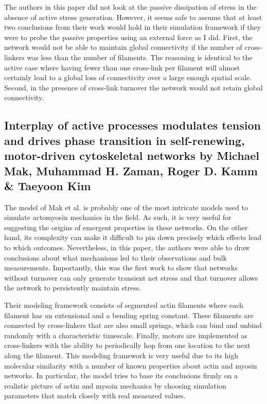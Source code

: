 The authors in this paper did not look at the passive dissipation of stress in the absence of active stress generation.  However, it seems safe to assume that at least two conclusions from their work would hold in their simulation framework if they were to probe the passive properties using an external force as I did.  First, the network would not be able to maintain global connectivity if the number of cross-linkers was less than the number of filaments.  The reasoning is identical to the active case where having fewer than one cross-link per filament will almost certainly lead to a global loss of connectivity over a large enough spatial scale.  Second, in the presence of cross-link turnover the network would not retain global connectivity.  

\subsection{Interplay of active processes modulates tension and drives phase transition in self-renewing, motor-driven cytoskeletal networks by	Michael Mak, Muhammad H. Zaman, Roger D. Kamm \& Taeyoon Kim}

The model of Mak et al. is probably one of the most intricate models used to simulate actomyosin mechanics in the field.  As such, it is very useful for suggesting the origins of emergent properties in these networks.  On the other hand, its complexity can make it difficult to pin down precisely which effects lead to which outcomes.  Nevertheless, in this paper, the authors were able to draw conclusions about what mechanisms led to their observations and bulk measurements.  Importantly, this was the first work to show that networks without turnover can only generate transient net stress and that turnover allows the network to persistently maintain stress.

Their modeling framework consists of segmented actin filaments where each filament has an extensional and a bending spring constant.  These filaments are connected by cross-linkers that are also small springs, which can bind and unbind randomly with a characteristic timescale.  Finally, motors are implemented as cross-linkers with the ability to periodically hop from one location to the next along the filament.  This modeling framework is very useful due to its high molecular similarity with a number of known properties about actin and myosin networks.  In particular, the model tries to base its conclusions firmly on a realistic picture of actin and mysoin mechanics by choosing simulation parameters that match closely with real measured values.  

